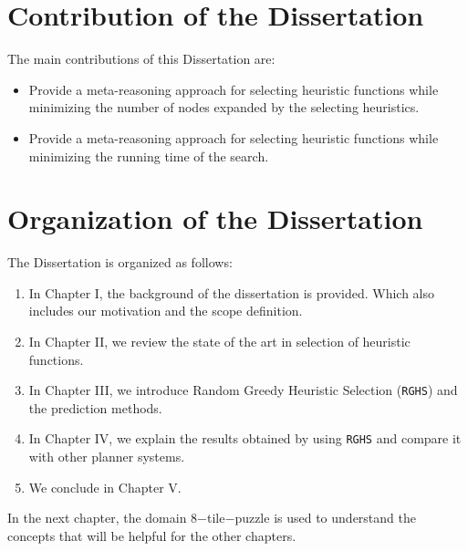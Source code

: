 \section{Contribution of the Dissertation}
\noindent
The main contributions of this Dissertation are:
\begin{itemize}
\item Provide a meta-reasoning approach for selecting heuristic functions while minimizing the number of nodes expanded by the selecting heuristics.

\item Provide a meta-reasoning approach for selecting heuristic functions while minimizing the running time of the search. 
\end{itemize}

\section{Organization of the Dissertation}
\noindent
The Dissertation is organized as follows: 
\begin{enumerate}
\item In Chapter I, the background of the dissertation is provided. Which also includes our motivation and the scope definition.
\item In Chapter II, we review the state of the art in selection of heuristic functions.
\item In Chapter III, we introduce Random Greedy Heuristic Selection (\texttt{RGHS}) and the prediction methods. 
\item In Chapter IV, we explain the results obtained by using \texttt{RGHS} and compare it with other planner systems.
\item We conclude in Chapter V.
\end{enumerate}

In the next chapter, the domain 8$-$tile$-$puzzle is used to understand the concepts that will be helpful for the other chapters. \\

\clearpage
